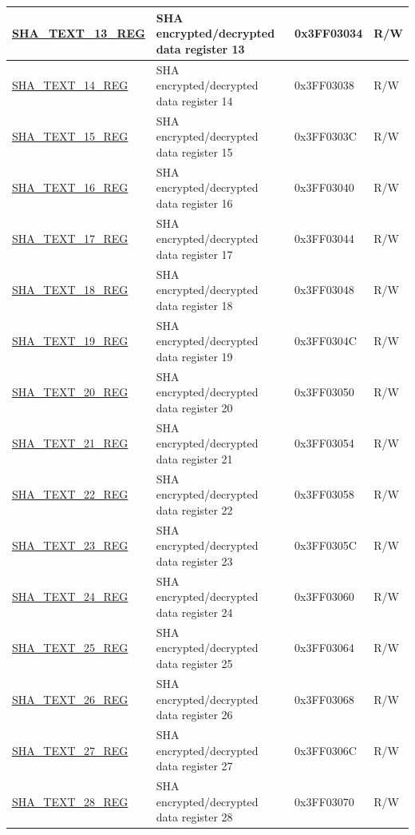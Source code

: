 \begin{longtable}{ | p{5cm} | p{7cm} | p{2cm} | p{1cm} | }
\hyperref[regdesc:SHATEXTnREG]{SHA\_TEXT\_13\_REG} & SHA encrypted/decrypted data register 13 & 0x3FF03034 & R/W \\ \hline
\hyperref[regdesc:SHATEXTnREG]{SHA\_TEXT\_14\_REG} & SHA encrypted/decrypted data register 14 & 0x3FF03038 & R/W \\ \hline
\hyperref[regdesc:SHATEXTnREG]{SHA\_TEXT\_15\_REG} & SHA encrypted/decrypted data register 15 & 0x3FF0303C & R/W \\ \hline
\hyperref[regdesc:SHATEXTnREG]{SHA\_TEXT\_16\_REG} & SHA encrypted/decrypted data register 16 & 0x3FF03040 & R/W \\ \hline
\hyperref[regdesc:SHATEXTnREG]{SHA\_TEXT\_17\_REG} & SHA encrypted/decrypted data register 17 & 0x3FF03044 & R/W \\ \hline
\hyperref[regdesc:SHATEXTnREG]{SHA\_TEXT\_18\_REG} & SHA encrypted/decrypted data register 18 & 0x3FF03048 & R/W \\ \hline
\hyperref[regdesc:SHATEXTnREG]{SHA\_TEXT\_19\_REG} & SHA encrypted/decrypted data register 19 & 0x3FF0304C & R/W \\ \hline
\hyperref[regdesc:SHATEXTnREG]{SHA\_TEXT\_20\_REG} & SHA encrypted/decrypted data register 20 & 0x3FF03050 & R/W \\ \hline
\hyperref[regdesc:SHATEXTnREG]{SHA\_TEXT\_21\_REG} & SHA encrypted/decrypted data register 21 & 0x3FF03054 & R/W \\ \hline
\hyperref[regdesc:SHATEXTnREG]{SHA\_TEXT\_22\_REG} & SHA encrypted/decrypted data register 22 & 0x3FF03058 & R/W \\ \hline
\hyperref[regdesc:SHATEXTnREG]{SHA\_TEXT\_23\_REG} & SHA encrypted/decrypted data register 23 & 0x3FF0305C & R/W \\ \hline
\hyperref[regdesc:SHATEXTnREG]{SHA\_TEXT\_24\_REG} & SHA encrypted/decrypted data register 24 & 0x3FF03060 & R/W \\ \hline
\hyperref[regdesc:SHATEXTnREG]{SHA\_TEXT\_25\_REG} & SHA encrypted/decrypted data register 25 & 0x3FF03064 & R/W \\ \hline
\hyperref[regdesc:SHATEXTnREG]{SHA\_TEXT\_26\_REG} & SHA encrypted/decrypted data register 26 & 0x3FF03068 & R/W \\ \hline
\hyperref[regdesc:SHATEXTnREG]{SHA\_TEXT\_27\_REG} & SHA encrypted/decrypted data register 27 & 0x3FF0306C & R/W \\ \hline
\hyperref[regdesc:SHATEXTnREG]{SHA\_TEXT\_28\_REG} & SHA encrypted/decrypted data register 28 & 0x3FF03070 & R/W \\ \hline

\end{longtable}
